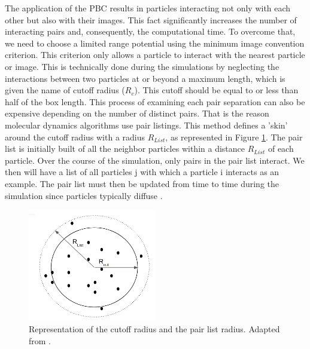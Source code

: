 \documentclass[
	12pt,				%
	openany,			%
	oneside,			%
	a4paper,			%
	english,			%
	brazil				%
	]{abntex2}
\providecommand{\DIFaddbegin}{}
\providecommand{\DIFaddend}{}
\providecommand{\DIFdelbegin}{}
\providecommand{\DIFdelend}{}
\providecommand{\DIFaddbegin}{} %
\providecommand{\DIFaddend}{} %
\providecommand{\DIFdelbegin}{} %
\providecommand{\DIFdelend}{} %
\begin{document}
\DIFdelend \DIFaddbegin \FloatBarrier
\DIFaddend The application of the PBC results in particles interacting not only with each other but also with their images. This fact significantly increases the number of interacting pairs and, consequently, the computational time. To overcome that, we need to choose a limited range potential using the minimum image convention criterion. This criterion only allows a particle to interact with the nearest particle or image.  This is technically done during the simulations by neglecting the interactions between two particles at or beyond a maximum length, which is given the name of cutoff radius ($R_{c}$). This cutoff should be equal to or less than half of the box length. This process of examining each pair separation can also be expensive depending on the number of distinct pairs. That is the reason molecular dynamics algorithms use pair listings. This method defines a 'skin' around the cutoff radius with a radius $R_{List}$, as represented in Figure \ref{fig:pairlist}. The pair list is initially built of all the neighbor particles within a distance $R_{List}$ of each particle. Over the course of the simulation, only pairs in the pair list interact. We then will have a list of all particles j with which a particle i interacts as an example. The pair list must then be updated from time to time during the simulation since particles typically diffuse \cite{tuckerman}.    

\begin{figure}[h]
	\centering
	\includegraphics[width=0.5\textwidth]{Figures/pairlist}
	\caption{Representation of the cutoff radius and the pair list radius. Adapted from .}
	\label{fig:pairlist}
\end{figure}
\DIFdelbegin %
\end{document}
